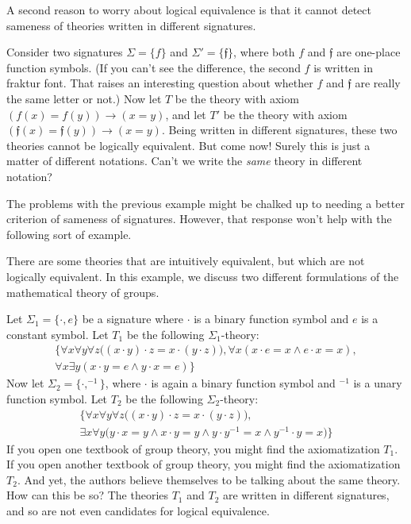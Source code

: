 A second reason to worry about logical equivalence is that it cannot
detect sameness of theories written in different signatures.

\begin{example} Consider two signatures $\Sigma = \{ f \}$ and
  $\Sigma ' = \{ \mathfrak{f} \}$, where both $f$ and $\mathfrak{f}$
  are one-place function symbols.  (If you can't see the difference,
  the second $f$ is written in fraktur font.  That raises an
  interesting question about whether $f$ and $\mathfrak{f}$ are really
  the same letter or not.)  Now let $T$ be the theory with axiom
  $(f(x)=f(y))\to (x=y)$, and let $T'$ be the theory with axiom
  $(\mathfrak{f}(x)=\mathfrak{f}(y))\to (x=y)$.  Being written in
  different signatures, these two theories cannot be logically
  equivalent. But come now!  Surely this is just a matter of different
  notations.  Can't we write the \textit{same} theory in different
  notation? \end{example}

The problems with the previous example might be chalked up to needing
a better criterion of sameness of signatures.  However, that response
won't help with the following sort of example.


\begin{example} \label{groups} There are some theories that are
  intuitively equivalent, but which are not logically equivalent.  In
  this example, we discuss two different formulations of the
  mathematical theory of groups.

  Let $\Sigma_1=\{\cdot, e\}$ be a signature where $\cdot$ is a binary
  function symbol and $e$ is a constant symbol.  Let $T_1$ be the
  following $\Sigma_1$-theory:
  \begin{gather*}
\big\{\forall x\forall y \forall z \big((x\cdot y)\cdot z=x\cdot (y\cdot z)\big), 
\forall x (x\cdot e=x \land e\cdot x=x),\\
\forall x \exists y (x\cdot y=e \land y\cdot x=e)
\big\}
\end{gather*}
Now let $\Sigma_2=\{\cdot, ^{-1}\}$, where $\cdot$ is again a binary
function symbol and $^{-1}$ is a unary function symbol.  Let $T_2$ be
the following $\Sigma_2$-theory:
\begin{gather*}
\big\{
\forall x\forall y \forall z \big((x\cdot y)\cdot z=x\cdot (y\cdot z)\big),\\ 
\exists x \forall y  \big(y\cdot x=y \land x\cdot y=y \land y\cdot y^{-1}=x \land y^{-1}\cdot y=x\big)
\big\}
\end{gather*}
If you open one textbook of group theory, you might find the
axiomatization $T_1$.  If you open another textbook of group theory,
you might find the axiomatization $T_2$.  And yet, the authors believe
themselves to be talking about the same theory.  How can this be so?
The theories $T_1$ and $T_2$ are written in different signatures, and
so are not even candidates for logical equivalence.
\end{example}

